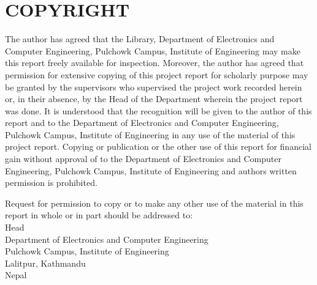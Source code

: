 
\newpage
{} {}

\section*{COPYRIGHT}

The author has agreed that the Library, Department of Electronics and Computer Engineering, Pulchowk Campus, Institute of Engineering may make
this report freely available for inspection. Moreover, the author has agreed that permission for extensive copying of this project report for 
scholarly purpose may be granted by the supervisors who supervised the project work recorded herein or, in their absence, by the Head of the 
Department wherein the project report was done. It is understood that the recognition will be given to the author of this report and to the 
Department of Electronics and Computer Engineering, Pulchowk Campus, Institute of Engineering in any use of the material of this project report. 
Copying or publication or the other use of this report for financial gain without approval of to the Department of Electronics and 
Computer Engineering, Pulchowk Campus, Institute of Engineering and author\textquotesingle s written permission is prohibited.

Request for permission to copy or to make any other use of the material in this report in whole or in part should be addressed to:\\

Head\\
Department of Electronics and Computer Engineering\\
Pulchowk Campus, Institute of Engineering\\
Lalitpur, Kathmandu\\
Nepal\\
